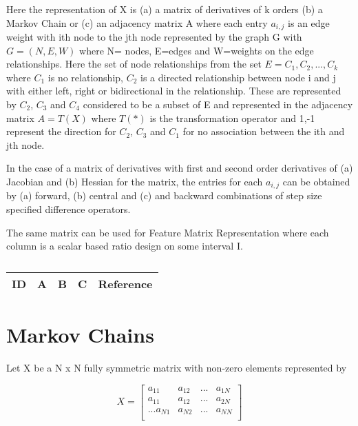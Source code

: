 Here the representation of X is (a) a matrix of derivatives of k orders (b) a Markov Chain or (c) an adjacency matrix A where each entry $a_{i,j}$ is an edge weight with ith node to the jth node represented by the graph G with $G=(N,E,W)$ where N= nodes, E=edges and W=weights on the edge relationships.  Here the set of node relationships from the set $E={C_{1}, C_{2},...,C_{k}}$ where $C_{1}$ is no relationship,  $C_{2}$ is a directed relationship between node i and j with either left, right or bidirectional in the relationship.  These are represented by $C_{2}$, $C_{3}$ and $C_{4}$ considered to be a subset of E and represented in the adjacency matrix $A=T(X)$ where $T(*)$ is the transformation operator and 1,-1 represent the direction for $C_{2}$, $C_{3}$ and $C_{1}$ for no association between the ith and jth node. 

In the case of a matrix of derivatives with first and second order derivatives of (a) Jacobian and (b) Hessian  for the matrix, the entries for each $a_{i,j}$ can be obtained by (a) forward, (b) central and (c) and backward combinations of step size specified difference operators. 

The same matrix can be used for Feature Matrix Representation where each column is a scalar based ratio design on some interval I.

\centering
\begin{table}[H]\footnotesize
	\caption{}
	\begin{tabular}{rp{1cm}p{2cm}p{3cm}p{1cm}}
		\hline
		ID & A & B & C & Reference \\
		\hline
		\hline
	\end{tabular}
\end{table}
\raggedright

\section{Markov Chains}

Let X be a N x N fully symmetric matrix with non-zero elements represented by 

\begin{equation}
X=
\begin{bmatrix}
a_{11} & a_{12} & ... & a_{1N} \\
a_{11} & a_{12} & ... & a_{2N} \\
.
.
.
a_{N1} & a_{N2} & ... & a_{NN} \\
\end{bmatrix}
\end{equation}


